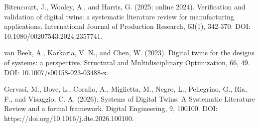 Bitencourt, J., Wooley, A., and Harris, G. (2025; online 2024). Verification and validation of digital twins: a systematic literature review for manufacturing applications. International Journal of Production Research, 63(1), 342-370. DOI: 10.1080/00207543.2024.2357741.

van Beek, A., Karkaria, V. N., and Chen, W. (2023). Digital twins for the designs of systems: a perspective. Structural and Multidisciplinary Optimization, 66, 49. DOI: 10.1007/s00158-023-03488-x.

Gervasi, M., Bove, L., Corallo, A., Miglietta, M., Negro, L., Pellegrino, G., Ria, F., and Visaggio, C. A. (2026). Systems of Digital Twins: A Systematic Literature Review and a formal framework. Digital Engineering, 9, 100100. DOI: https://doi.org/10.1016/j.dte.2026.100100.

